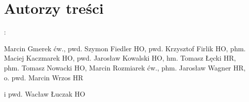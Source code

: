 \chapter{Autorzy treści}:

Marcin Gmerek ćw., pwd. Szymon Fiedler HO, pwd. Krzysztof Firlik HO, phm. Maciej Kaczmarek HO, pwd. Jarosław Kowalski HO, hm. Tomasz Łęcki HR, phm. Tomasz Nowacki HO, Marcin Rozmiarek ćw., phm. Jarosław Wagner HR, o. pwd. Marcin Wrzos HR 


i pwd. Wacław Łuczak HO